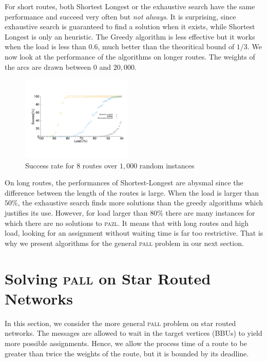 \documentclass[a4paper,10pt]{IEEEtran}
\newcommand\pazl{\textsc{pazl}\xspace}
\newcommand\pall{\textsc{pall}\xspace}
\begin{document}
      
      For short routes, both  Shortest Longest or the exhaustive search have the same performance and succeed very often but \emph{not always}. It is surprising, since exhaustive search is guaranteed to find a solution when it exists, while Shortest Longest is only an heuristic. The Greedy algorithm is less effective but it works when the load is less than $0.6$, much better than the theoritical bound of $1/3$. We now look at the performance of the algorithms on longer routes. The weights of the arcs are drawn between $0$ and $20,000$.

   
\begin{figure}[h]

       \begin{center}
      \includegraphics[width=0.47\textwidth]{echec_longues.pdf}
      \end{center}
       
      \caption{Success rate for $8$ routes over $1,000$ random instances}\label{fig:long}
     \end{figure}
     
     On long routes, the performances of Shortest-Longest are abysmal since the difference between the length of the routes is large.
       When the load is larger than $50\%$, the exhaustive search finds more solutions than the greedy algorithms which justifies its use. However, for load larger than $80\%$ there are many instances for which there are no solutions to \pazl.
        It means that with long routes and high load, looking for an assignment without waiting time is far too restrictive. That is why we present algorithms for the general \pall problem in our next section. 
     

         \section{Solving \pall on Star Routed Networks}\label{sec:PALL}
         
    In this section, we consider the more general \pall problem on star routed networks. The messages are allowed to wait in the target vertices (BBUs) to yield more possible assignments. Hence, we allow the process time of a route to be greater than twice the weights of the route, but it is bounded by its deadline.
  
\end{document}
